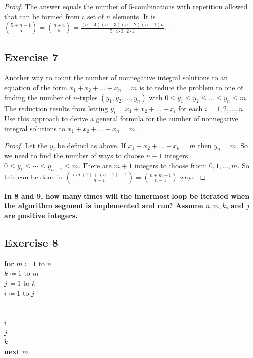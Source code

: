\documentclass[14pt]{extarticle}
\newcommand{\cy}{\color{cyan}}
\begin{document}
\begin{proof}
The answer equals the number of 5-combinations with repetition allowed that can be formed from a set of \(n\) elements. It is
\(\binom{5+n-1}{5} = \binom{n+4}{5} = \frac{(n+4)(n+3)(n+2)(n+1)n}{5 \cdot 4 \cdot 3 \cdot 2 \cdot 1}\).
\end{proof}

\subsection{Exercise 7}
Another way to count the number of nonnegative integral solutions to an equation of the form \(x_1 + x_2 + \ldots + 
x_n = m\) is to reduce the problem to one of finding the number of \(n\)-tuples \((y_1, y_2, \ldots, y_n)\) with 
\(0 \leq y_1 \leq y_2 \leq \ldots \leq y_n \leq m\). The reduction results from letting \(y_i = x_1 + x_2 + \ldots + 
x_i\) for each \(i = 1, 2, \ldots, n\). Use this approach to derive a general formula for the number of nonnegative 
integral solutions to \(x_1 + x_2 + \ldots + x_n = m\).

\begin{proof}
Let the \(y_i\) be defined as above. If \(x_1 + x_2 + \ldots + x_n = m\) then \(y_n = m\). So we need to find the number of
ways to choose \(n-1\) integers \(0 \leq y_1 \leq \cdots \leq y_{n-1} \leq m\). There are \(m+1\) integers to choose from: 
\(0, 1, \ldots, m\). So this can be done in \(\binom{(m+1) + (n-1) - 1}{n-1} = \binom{n+m-1}{n-1}\) ways.
\end{proof}

{\bf \cy In 8 and 9, how many times will the innermost loop be iterated when the algorithm segment is implemented and run? 
Assume \(n, m, k\), and \(j\) are positive integers.}

\subsection{Exercise 8}
\begin{tabbing}
{\bf for} \=\(m \coloneqq 1\) to \(n\) \\
           \=\(k \coloneqq 1\) to \(m\) \\
          \>          \=\(j\coloneqq 1\) to \(k\)\\
          \>         \>          \=\(i \coloneqq 1\) to \(j\) \\
          \>         \>         \>          \>{\it [Statements in the body of the inner loop, none} \\
          \>         \>         \>          \>{\it containing branching statements that lead outside the loop]} \\
          \>         \>          \(i\) \\
          \>          \(j\) \\
           \(k\) \\
{\bf next} \(m\)
\end{tabbing}
\end{document}
